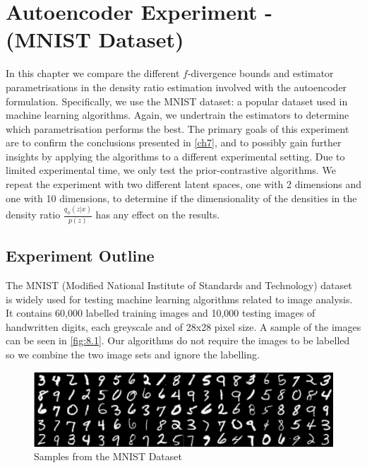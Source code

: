 \documentclass[honours,12pt]{unswthesis}
\numberwithin{equation}{section}
\theoremstyle{definition}
\begin{document}
\chapter{Autoencoder Experiment - (MNIST Dataset)}\label{ch8}
In this chapter we compare the different $f$-divergence bounds and estimator parametrisations in the density ratio estimation involved with the autoencoder formulation. Specifically, we use the MNIST dataset: a popular dataset used in machine learning algorithms. Again, we undertrain the estimators to determine which parametrisation performs the best. The primary goals of this experiment are to confirm the conclusions presented in \autoref{ch7}, and to possibly gain further insights by applying the algorithms to a different experimental setting. Due to limited experimental time, we only test the prior-contrastive algorithms. We repeat the experiment with two different latent spaces, one with 2 dimensions and one with 10 dimensions, to determine if the dimensionality of the densities in the density ratio $\frac{q_\phi(z|x)}{p(z)}$ has any effect on the results.
\section{Experiment Outline}
The MNIST (Modified National Institute of Standards and Technology) dataset is widely used for testing machine learning algorithms related to image analysis. It contains 60,000 labelled training images and 10,000 testing images of handwritten digits, each greyscale and of 28x28 pixel size. A sample of the images can be seen in \autoref{fig:8.1}. Our algorithms do not require the images to be labelled so we combine the two image sets and ignore the labelling.
\begin{figure}[b]
\includegraphics[width=\linewidth]{mnist-digits-small.png}
\caption{Samples from the MNIST Dataset}
\label{fig:8.1}
\end{figure}
\end{document}
